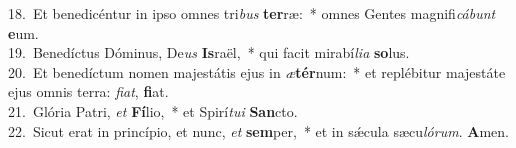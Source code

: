 {18.~}Et benedicéntur in ipso omnes tri\textit{bus} \textbf{ter}ræ:~* omnes Gentes magnifi\textit{cá}\textit{bunt} \textbf{e}um.\\
{19.~}Benedíctus Dóminus, De\textit{us} \textbf{Is}raël,~* qui facit mirabí\textit{li}\textit{a} \textbf{so}lus.\\
{20.~}Et benedíctum nomen majestátis ejus in \textit{æ}\textbf{tér}num:~* et replébitur majestáte ejus omnis terra: \textit{fi}\textit{at}, \textbf{fi}at.\\
{21.~}Glória Patri, \textit{et} \textbf{Fí}lio,~* et Spirí\textit{tu}\textit{i} \textbf{San}cto.\\
{22.~}Sicut erat in princípio, et nunc, \textit{et} \textbf{sem}per,~* et in sǽcula sæcu\textit{ló}\textit{rum}. \textbf{A}men.\\
